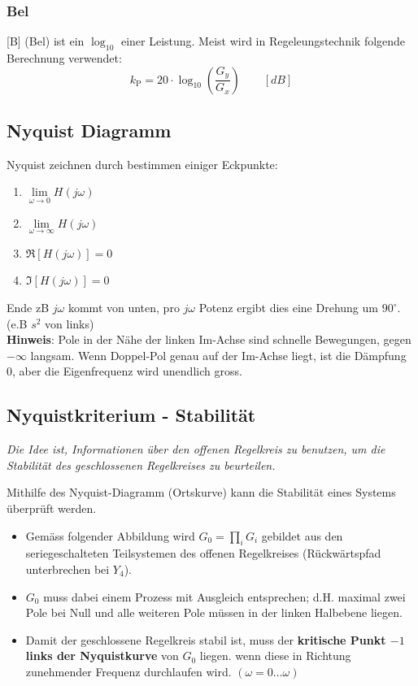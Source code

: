 \subsubsection{Bel}
[B] (Bel) ist ein $\log_{10}$ einer Leistung. Meist wird in Regeleungstechnik folgende Berechnung verwendet:
\[k_{\text{P}} = 20 \cdot \log_{10}\left(\frac{G_y}{G_x}\right) \qquad [dB]\]


\subsection{Nyquist Diagramm}
Nyquist zeichnen durch bestimmen einiger Eckpunkte:
\begin{enumerate}[nosep]
	\item $\lim\limits_{\omega \rightarrow 0}H(j\omega)$
	\item $\lim\limits_{\omega \rightarrow \infty}H(j\omega)$
	\item $\Re[H(j\omega)] = 0$
	\item $\Im[H(j\omega)] = 0$
\end{enumerate}
Ende zB $j\omega$ kommt von unten, pro $j\omega$ Potenz ergibt dies eine Drehung um $90^\circ$. (e.B $s^2$ von links)
~\\
\textbf{Hinweis}: Pole in der Nähe der linken Im-Achse sind schnelle Bewegungen, gegen $-\infty$ langsam. Wenn Doppel-Pol genau auf der Im-Achse liegt, ist die Dämpfung 0, aber die Eigenfrequenz wird unendlich gross.


\subsection{Nyquistkriterium - Stabilität}
\begin{center}
\textit{Die Idee ist, Informationen über den offenen Regelkreis zu benutzen, um die Stabilität des geschlossenen Regelkreises zu beurteilen. }
\end{center}
Mithilfe des Nyquist-Diagramm (Ortskurve) kann die Stabilität eines Systems überprüft werden.
\begin{itemize}[nosep]
	\item Gemäss folgender Abbildung wird $G_0 = \prod_{i}G_i$ gebildet aus den seriegeschalteten Teilsystemen des offenen Regelkreises (Rückwärtspfad unterbrechen bei $Y_4$).
	\item $G_0$ muss dabei einem Prozess mit Ausgleich entsprechen; d.H. maximal zwei Pole bei Null und alle weiteren Pole müssen in der linken Halbebene liegen.
	\item Damit der geschlossene Regelkreis stabil ist, muss der \textbf{kritische Punkt $-1$ links der Nyquistkurve} von $G_0$ liegen. wenn diese in Richtung zunehmender Frequenz durchlaufen wird. $(\omega = 0\dots\omega)$
\end{itemize}

